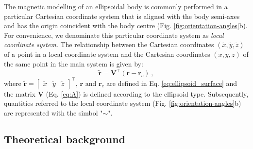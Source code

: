 \documentclass[gmd, manuscript]{copernicus}
\begin{document}
The magnetic modelling of an ellipsoidal body is commonly performed
in a particular Cartesian coordinate system that is aligned
with the body semi-axes
and has the origin coincident with the body centre
(Fig. \ref{fig:orientation-angles}b).
For convenience, we denominate this particular coordinate
system as \textit{local coordinate system}.
The relationship between the Cartesian coordinates
$(\tilde{x}, \tilde{y}, \tilde{z})$ of a point in
a local coordinate system and the Cartesian
coordinates $(x, y, z)$ of the same point in the main
system is given by:
\begin{equation}
\tilde{\mathbf{r}} = \mathbf{V}^{\top} \left( \mathbf{r} - \mathbf{r}_{c} \right) \: ,
\label{eq:coord_transformation}
\end{equation}
where
$\tilde{\mathbf{r}} = [\begin{array}{ccc} \tilde{x} &
                                          \tilde{y} &
                                          \tilde{z} \end{array} ]^{\top}$,
$\mathbf{r}$ and $\mathbf{r}_{c}$
are defined in Eq. \ref{eq:ellipsoid_surface} and the matrix $\mathbf{V}$
(Eq. \ref{eq:A}) is defined according to the ellipsoid type.
Subsequently, quantities referred to the local coordinate system
(Fig. \ref{fig:orientation-angles}b) are represented with
the simbol "$\sim$".


\subsection{Theoretical background}
\end{document}
